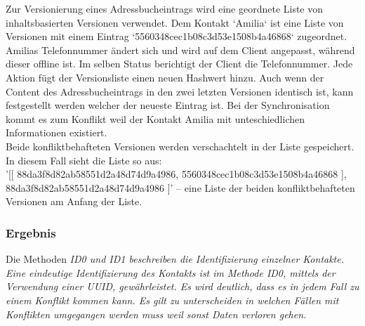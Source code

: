 \begin{description}[leftmargin=0.5cm,style=nextline]
  \item[Methode V4 -- Liste von inhaltsbasierten Versionen:]
    Zur Versionierung eines Adressbucheintrags wird eine geordnete Liste von inhaltsbasierten Versionen verwendet.
    Dem Kontakt `Amilia` ist eine Liste von Versionen mit einem Eintrag `5560348cec1b08c3d53e1508b4a46868` zugeordnet.
    Amilias Telefonnummer ändert sich und wird auf dem Client angepasst, während dieser offline ist. Im selben Status berichtigt der Client die Telefonnummer.
    Jede Aktion fügt der Versionsliste einen neuen Hashwert hinzu.
    Auch wenn der Content des Adressbucheintrags in den zwei letzten Versionen identisch ist, kann festgestellt werden welcher der neueste Eintrag ist.
    Bei der Synchronisation kommt es zum Konflikt weil der Kontakt Amilia mit unteschiedlichen Informationen existiert.\\
    Beide konfliktbehafteten Versionen werden verschachtelt in der Liste gespeichert.
    In diesem Fall sieht die Liste so aus: \\
    '[[ 88da3f8d82ab58551d2a48d74d9a4986, 5560348cec1b08c3d53e1508b4a46868 ], 88da3f8d82ab58551d2a48d74d9a4986 ]' -- eine Liste der beiden konfliktbehafteten Versionen am Anfang der Liste.
\end{description}
%
%
\subsubsection*{Ergebnis}
Die Methoden \it{ID0} und \it{ID1} beschreiben die Identifizierung einzelner Kontakte. Eine eindeutige Identifizierung des Kontakts ist im Methode \it{ID0}, mittels der Verwendung einer \gls{UUID}, gewährleistet.
Es wird deutlich, dass es in jedem Fall zu einem Konflikt kommen kann. Es gilt zu unterscheiden in welchen Fällen mit Konflikten umgegangen werden muss weil sonst Daten verloren gehen.